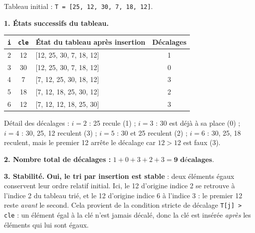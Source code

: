 \documentclass[11pt]{article}
\begin{document}
\begin{corrige}
Tableau initial : \texttt{T = [25, 12, 30, 7, 18, 12]}.

\textbf{1. États successifs du tableau.}

\begin{center}
\begin{tabularx}{\linewidth}{|c|c|X|c|}
\hline
\rowcolor{popblueL}
\texttt{i} & \texttt{cle} & État du tableau après insertion & Décalages \\
\hline
2 & 12 & [12, 25, 30, 7, 18, 12] & 1 \\
\hline
3 & 30 & [12, 25, 30, 7, 18, 12] & 0 \\
\hline
4 & 7 & [7, 12, 25, 30, 18, 12] & 3 \\
\hline
5 & 18 & [7, 12, 18, 25, 30, 12] & 2 \\
\hline
6 & 12 & [7, 12, 12, 18, 25, 30] & 3 \\
\hline
\end{tabularx}
\end{center}

Détail des décalages : $i=2$ : 25 recule (1) ; $i=3$ : 30 est déjà à sa place (0) ; $i=4$ : 30, 25, 12 reculent (3) ; $i=5$ : 30 et 25 reculent (2) ; $i=6$ : 30, 25, 18 reculent, mais le premier 12 arrête le décalage car $12 > 12$ est faux (3).

\textbf{2. Nombre total de décalages :} $1 + 0 + 3 + 2 + 3 = \textbf{9 décalages}$.

\textbf{3. Stabilité.} \textbf{Oui, le tri par insertion est stable} : deux éléments égaux conservent leur ordre relatif initial. Ici, le 12 d'origine indice 2 se retrouve à l'indice 2 du tableau trié, et le 12 d'origine indice 6 à l'indice 3 : le premier 12 reste \emph{avant} le second. Cela provient de la condition stricte de décalage \texttt{T[j] > cle} : un élément égal à la clé n'est jamais décalé, donc la clé est insérée \emph{après} les éléments qui lui sont égaux.
\end{corrige}
\end{document}
